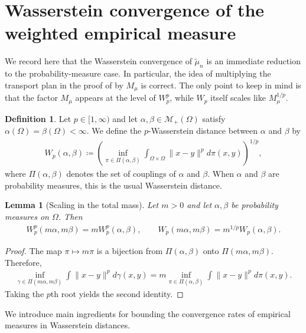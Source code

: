 \documentclass[11pt,reqno]{amsart}
\newtheorem{lemma}[theorem]{Lemma}
\theoremstyle{definition}
\newtheorem{definition}{Definition}
\renewcommand{\tilde}{\widetilde}
\newcommand{\mM}{\mathcal{M}}
\begin{document}
\section{Wasserstein convergence of the weighted empirical measure} \label{sec:empirical_wasserstein}


We record here that the Wasserstein convergence of $\tilde\mu_n$ is an immediate reduction to the probability-measure case. In particular, the idea of multiplying the transport plan in the proof of \cite{weed2019sharp} by $M_\mu$ is correct. The only point to keep in mind is that the factor $M_\mu$ appears at the level of $W_p^p$, while $W_p$ itself scales like $M_\mu^{1/p}$.

\begin{definition}
Let $p\in[1,\infty)$ and let $\alpha,\beta\in \mM_+(\Omega)$ satisfy $\alpha(\Omega)=\beta(\Omega)<\infty$.
We define the $p$-Wasserstein distance between $\alpha$ and $\beta$ by
\begin{align}
    W_p(\alpha,\beta) \coloneqq \left( \inf_{\pi\in\Pi(\alpha,\beta)} \int_{\Omega\times\Omega} \|x-y\|^p   d\pi(x,y) \right)^{1/p},
\end{align}
where $\Pi(\alpha,\beta)$ denotes the set of couplings of $\alpha$ and $\beta$.
When $\alpha$ and $\beta$ are probability measures, this is the usual Wasserstein distance.
\end{definition}

\begin{lemma}[Scaling in the total mass] \label{lem:mass_scaling_wasserstein}
Let $m>0$ and let $\alpha,\beta$ be probability measures on $\Omega$.
Then
\begin{align}
    W_p^p(m\alpha,m\beta) = m   W_p^p(\alpha,\beta),
    \qquad
    W_p(m\alpha,m\beta) = m^{1/p} W_p(\alpha,\beta).
\end{align}
\end{lemma}

\begin{proof}
The map $\pi \mapsto m\pi$ is a bijection from $\Pi(\alpha,\beta)$ onto $\Pi(m\alpha,m\beta)$.
Therefore,
\begin{align}
    \inf_{\gamma\in\Pi(m\alpha,m\beta)} \int \|x-y\|^p   d\gamma(x,y)
    = m \inf_{\pi\in\Pi(\alpha,\beta)} \int \|x-y\|^p   d\pi(x,y).
\end{align}
Taking the $p$th root yields the second identity.
\end{proof}

We introduce main ingredients for bounding the convergence rates of empirical measures in Wasserstein distances.
\end{document}

